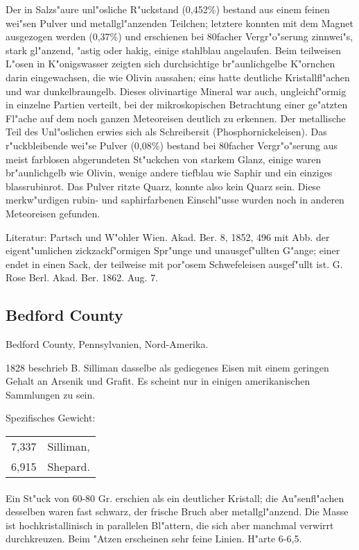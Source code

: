 \documentclass[a4paper, 11pt, oneside]{article}
\begin{document}
Der in Salzs"aure unl"osliche R"uckstand (0,452\%) bestand aus einem feinen wei"sen Pulver und metallgl"anzenden Teilchen; letztere konnten mit dem Magnet ausgezogen werden (0,37\%) und erschienen bei 80facher Vergr"o"serung zinnwei"s, stark gl"anzend, "astig oder hakig, einige stahlblau angelaufen. Beim teilweisen L"osen in K"onigswasser zeigten sich durchsichtige br"aunlichgelbe K"ornchen darin eingewachsen, die wie Olivin aussahen; eins hatte deutliche Kristallfl"achen und war dunkelbraungelb. Dieses olivinartige Mineral war auch, ungleichf"ormig in einzelne Partien verteilt, bei der mikroskopischen Betrachtung einer ge"atzten Fl"ache auf dem noch ganzen Meteoreisen deutlich zu erkennen. Der metallische Teil des Unl"oslichen erwies sich als Schreibersit (Phosphornickeleisen). Das r"uckbleibende wei"se Pulver (0,08\%) bestand bei 80facher Vergr"o"serung aus meist farblosen abgerundeten St"uckchen von starkem Glanz, einige waren br"aunlichgelb wie Olivin, wenige andere tiefblau wie Saphir und ein einziges blassrubinrot. Das Pulver ritzte Quarz, konnte also kein Quarz sein. Diese merkw"urdigen rubin- und saphirfarbenen Einschl"usse wurden noch in anderen Meteoreisen gefunden.

Literatur: Partsch und W"ohler Wien. Akad. Ber. 8, 1852, 496 mit Abb. der eigent"umlichen zickzackf"ormigen Spr"unge und unausgef"ullten G"ange; einer endet in einen Sack, der teilweise mit por"osem Schwefeleisen ausgef"ullt ist. G. Rose Berl. Akad. Ber. 1862. Aug. 7.

\subsection{Bedford County}

Bedford County, Pennsylvanien, Nord-Amerika.

1828 beschrieb B. Silliman dasselbe als gediegenes Eisen mit einem geringen Gehalt an Arsenik und Grafit. Es scheint nur in einigen amerikanischen Sammlungen zu sein.

Spezifisches Gewicht:  
\begin{table}[!ht]
    \centering
    \begin{tabular}{l l}
        7,337 & Silliman,\\
        6,915 & Shepard.
    \end{tabular}
\end{table}
\paragraph{}
Ein St"uck von 60-80 Gr. erschien als ein deutlicher Kristall; die Au"senfl"achen desselben waren fast schwarz, der frische Bruch aber metallgl"anzend. Die Masse ist hochkristallinisch in parallelen Bl"attern, die sich aber manchmal verwirrt durchkreuzen. Beim "Atzen erscheinen sehr feine Linien. H"arte 6-6,5.
\end{document}
